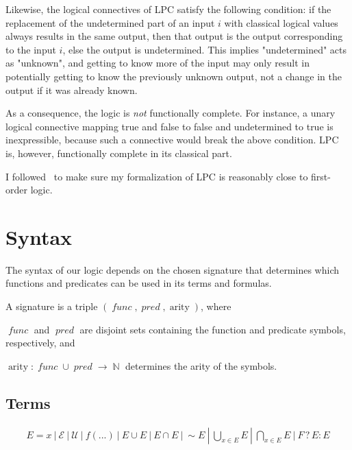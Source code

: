 \documentclass[oneside,12pt]{book}
\theoremstyle{definition}
\theoremstyle{remark}
\newcommand{\ct}{{\sim}} %
\newcommand\var[1]{\mathop{\mathit{#1}}\nolimits}
\DeclareMathOperator{\arity}{arity}
\newcommand{\conditional}[3]{#1 \mathrel{?} #2 : #3}
\newcommand{\Nat}{\var{\mathbb{N}}}
\newcommand{\Empty}{\mathcal{E}}
\newcommand{\Universal}{\mathcal{U}}
\newcommand{\func}{\var{func}}
\newcommand{\pred}{\var{pred}} %
\newcommand{\symb}{\var{symbol}}
\begin{document}
Likewise, the logical connectives of LPC satisfy the following condition:
if the replacement of the undetermined part of an input $i$ with classical
logical values always results in the same output, then that output is the output
corresponding to the input $i$, else the output is undetermined.
This implies "undetermined" acts as "unknown", and getting to know more of the input
may only result in potentially getting to know the previously unknown output,
not a change in the output if it was already known.

As a consequence, the logic is \textit{not} functionally complete. For instance,
a unary logical connective mapping true and false to false and undetermined to true
is inexpressible, because such a connective would break the above condition.
LPC is, however, functionally complete in its classical part.

I followed~\cite{firstOrderLogic} to make sure my formalization of LPC is reasonably close
to first-order logic.

\section{Syntax}
The syntax of our logic depends on the chosen signature that determines which
functions and predicates can be used in its terms and formulas.

\begin{defBox}
  A signature is a triple $(\func, \pred, \arity)$, where
  \begin{compactenum}
    \item $\func$ and $\pred$ are disjoint sets containing the function and predicate
      symbols, respectively, and
    \item $\arity\colon \func \cup \pred \to \Nat$ determines the arity
      of the symbols.
  \end{compactenum}
  
\end{defBox}

\subsection{Terms}
\begin{align*}
  E = x~|~\Empty~|~\Universal~|~f(...)~|~E \cup E~|~E \cap E~|~\ct E%
  ~|~\bigcup_{x \in E}E~|~\bigcap_{x \in E}E~|~\conditional{F}{E}{E}
\end{align*}
\end{document}
